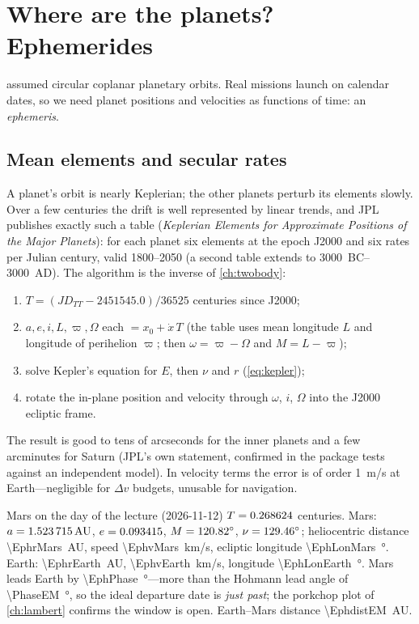 \documentclass[11pt,letterpaper,oneside]{report}
\newcommand{\dv}{\Delta v}
\begin{document}
\chapter{Where are the planets? Ephemerides}\label{ch:ephemeris}
 assumed circular coplanar planetary orbits. Real missions launch on calendar
dates, so we need planet positions and velocities as functions of time: an \emph{ephemeris}.

\section{Mean elements and secular rates}
A planet's orbit is nearly Keplerian; the other planets perturb its elements slowly. Over a few
centuries the drift is well represented by linear trends, and JPL publishes exactly such a table
(\emph{Keplerian Elements for Approximate Positions of the Major Planets}): for each planet six
elements at the epoch J2000 and six rates per Julian century, valid 1800--2050 (a second table
extends to 3000~BC--3000~AD). The algorithm is the inverse of \cref{ch:twobody}:
\begin{enumerate}[nosep]
\item $T=(JD_{TT}-2451545.0)/36525$ centuries since J2000;
\item $a, e, i, L, \varpi, \Omega$ each $=x_0+\dot x\,T$ (the table uses mean longitude $L$ and
      longitude of perihelion $\varpi$; then $\omega=\varpi-\Omega$ and $M=L-\varpi$);
\item solve Kepler's equation for $E$, then $\nu$ and $r$ (\cref{eq:kepler});
\item rotate the in-plane position and velocity through $\omega$, $i$, $\Omega$ into the J2000 ecliptic frame.
\end{enumerate}
The result is good to tens of arcseconds for the inner planets and a few arcminutes for Saturn
(JPL's own statement, confirmed in the package tests against an independent model). In velocity
terms the error is of order \SI{1}{m/s} at Earth---negligible for $\dv$ budgets, unusable for
navigation.

\begin{worked}{Mars on the day of the lecture (2026-11-12)}
$T=0.268624$ centuries. Mars: $a=\SI{1.523715}{AU}$, $e=0.093415$, $M=\SI{120.82}{\degree}$,
$\nu=\SI{129.46}{\degree}$; heliocentric distance \SI{\EphrMars}{AU}, speed \SI{\EphvMars}{km/s},
ecliptic longitude \SI{\EphLonMars}{\degree}. Earth: \SI{\EphrEarth}{AU}, \SI{\EphvEarth}{km/s},
longitude \SI{\EphLonEarth}{\degree}. Mars leads Earth by \SI{\EphPhase}{\degree}---more than the
Hohmann lead angle of \SI{\PhaseEM}{\degree}, so the ideal departure date is \emph{just past}; the
porkchop plot of \cref{ch:lambert} confirms the window is open. Earth--Mars distance \SI{\EphdistEM}{AU}.
\end{worked}
\end{document}
